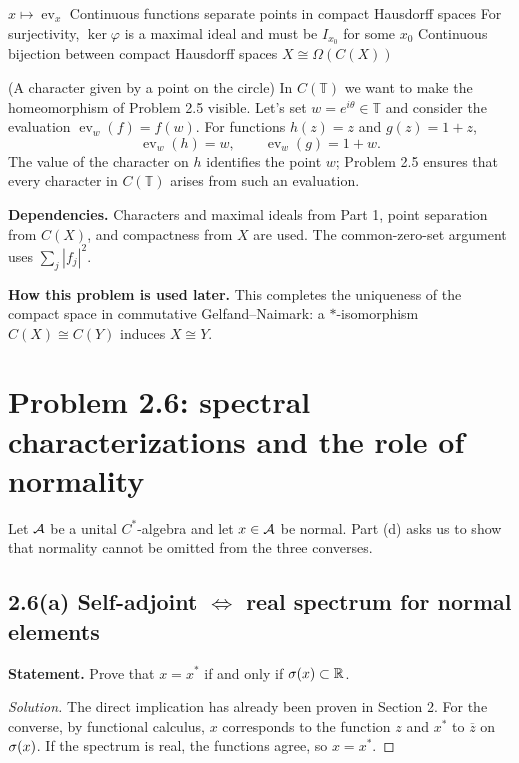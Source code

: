 \proofdiagrambranch
{$x\mapsto\operatorname{ev}_x$}
{Continuous functions separate points in compact Hausdorff spaces}
{For surjectivity, $\ker\varphi$ is a maximal ideal and must be $I_{x_0}$ for some $x_0$}
{Continuous bijection between compact Hausdorff spaces}
{$X\cong\Omega(C(X))$}

\begin{cthejemplo}{(A character given by a point on the circle)}
In $C(\mathbb T)$ we want to make the homeomorphism of Problem 2.5 visible.
Let's set $w=e^{i\theta}\in\mathbb T$ and consider the evaluation
$\operatorname{ev}_w(f)=f(w)$. For functions $h(z)=z$ and $g(z)=1+z$,
\[
 \operatorname{ev}_w(h)=w,\qquad \operatorname{ev}_w(g)=1+w.
\]
The value of the character on $h$ identifies the point $w$; Problem 2.5 ensures that every character in
$C(\mathbb T)$ arises from such an evaluation.
\end{cthejemplo}

\noindent\textbf{Dependencies.} Characters and maximal ideals from Part 1, point separation from $C(X)$, and compactness from $X$ are used. The common-zero-set argument uses $\sum_j|f_j|^2$.

\noindent\textbf{How this problem is used later.} This completes the uniqueness of the compact space in commutative Gelfand--Naimark: a $*$-isomorphism $C(X)\cong C(Y)$ induces $X\cong Y$.

\section{Problem 2.6: spectral characterizations and the role of normality}

Let $\mathcal A$ be a unital $C^*$-algebra and let $x\in\mathcal A$ be normal. Part (d) asks us to show that
normality cannot be omitted from the three converses.

\subsection*{2.6(a) Self-adjoint $\Longleftrightarrow$ real spectrum for normal elements}

\noindent\textbf{Statement.} Prove that $x=x^*$ if and only if $\sigma(x)\subset\mathbb R$.

\begin{proof}[Solution]
The direct implication has already been proven in Section 2. For the converse, by functional calculus,
$x$ corresponds to the function $z$ and $x^*$ to $\overline z$ on $\sigma(x)$. If the spectrum is real,
the functions agree, so $x=x^*$.
\end{proof}

